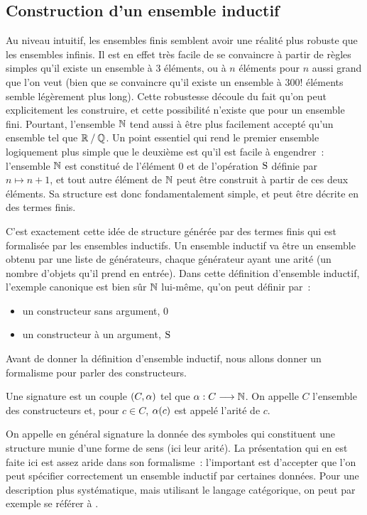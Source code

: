 \subsection{Construction d'un ensemble inductif}

Au niveau intuitif, les ensembles finis semblent avoir une réalité plus
robuste que les ensembles infinis. Il est en effet très facile de se convaincre
à partir de règles simples qu'il existe un ensemble à $3$ éléments, ou à $n$
éléments pour $n$ aussi grand que l'on veut (bien que se convaincre qu'il existe
un ensemble à $300!$ éléments semble légèrement plus long). Cette robustesse
découle du fait qu'on peut explicitement les construire, et cette possibilité
n'existe que pour un ensemble fini. Pourtant, l'ensemble $\mathbb N$ tend aussi
à être plus facilement accepté qu'un ensemble tel que $\mathord{\mathbb R}\mathbin{/}\mathord{\mathbb Q}$.
Un point essentiel qui rend le premier ensemble logiquement plus simple que le
deuxième est qu'il est facile à engendrer~: l'ensemble $\mathbb N$ est constitué
de l'élément $0$ et de l'opération $\operatorname{S}$ définie par $n \mapsto n + 1$, et tout
autre élément de $\mathbb N$ peut être construit à partir de ces deux éléments.
Sa structure est donc fondamentalement simple, et peut être décrite en des
termes finis.

C'est exactement cette idée de structure générée par des termes finis qui est
formalisée par les ensembles inductifs. Un ensemble inductif va être un ensemble
obtenu par une liste de générateurs, chaque générateur ayant une arité (un
nombre d'objets qu'il prend en entrée). Dans cette définition d'ensemble
inductif, l'exemple canonique est bien sûr $\mathbb N$ lui-même, qu'on peut
définir par~:
\begin{itemize}
\item un constructeur sans argument, $0$
\item un constructeur à un argument, $\operatorname{S}$
\end{itemize}

Avant de donner la définition d'ensemble inductif, nous allons donner un
formalisme pour parler des constructeurs.

\begin{definition}[Signature]
  Une signature est un couple $(C,\alpha)$ tel que
  $\alpha : \displaystyle C \longrightarrow \mathbb N$. On appelle $C$ l'ensemble des constructeurs
  et, pour $c \in C$, $\alpha(c)$ est appelé l'arité de $c$.
\end{definition}

On appelle en général signature la donnée des symboles qui constituent une
structure munie d'une forme de sens (ici leur arité). La présentation qui en est
faite ici est assez aride dans son formalisme~: l'important est d'accepter que
l'on peut spécifier correctement un ensemble inductif par certaines données.
Pour une description plus systématique, mais utilisant le langage catégorique,
on peut par exemple se référer à \cite{Jacobs1999}.

